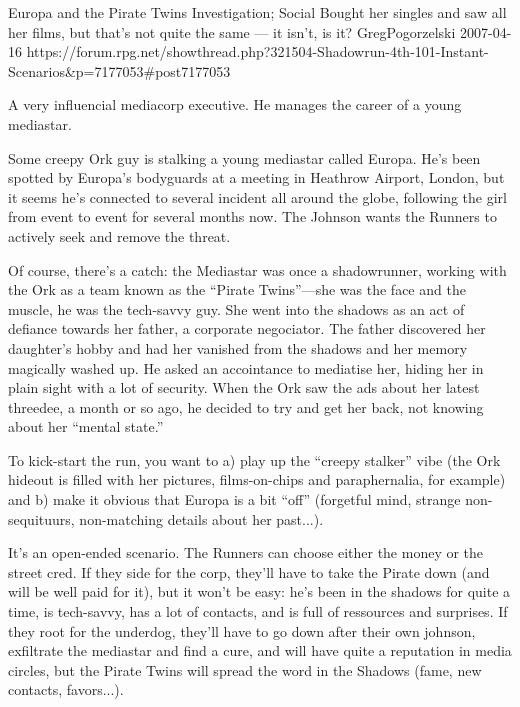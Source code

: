 \begin{scenario}{Europa and the Pirate Twins}
	{Investigation; Social}
	{Bought her singles and saw all her films, but that's not quite the same --- it isn't, is it?}
	{GregPogorzelski}
	{2007-04-16}
	{https://forum.rpg.net/showthread.php?321504-Shadowrun-4th-101-Instant-Scenarios\&p=7177053\#post7177053}

A very influencial mediacorp executive. He manages the career of a young mediastar.

\synopsis Some creepy Ork guy is stalking a young mediastar called Europa. He's been spotted by Europa's bodyguards at a meeting in Heathrow Airport, London, but it seems he's connected to several incident all around the globe, following the girl from event to event for several months now. The Johnson wants the Runners to actively seek and remove the threat.

\twist Of course, there's a catch: the Mediastar was once a shadowrunner, working with the Ork as a team known as the ``Pirate Twins''---she was the face and the muscle, he was the tech-savvy guy. She went into the shadows as an act of defiance towards her father, a corporate negociator. The father discovered her daughter's hobby and had her vanished from the shadows and her memory magically washed up. He asked an accointance to mediatise her, hiding her in plain sight with a lot of security. When the Ork saw the ads about her latest threedee, a month or so ago, he decided to try and get her back, not knowing about her ``mental state.''

\notes To kick-start the run, you want to a) play up the ``creepy stalker'' vibe (the Ork hideout is filled with her pictures, films-on-chips and paraphernalia, for example) and b) make it obvious that Europa is a bit ``off'' (forgetful mind, strange non-sequituurs, non-matching details about her past...).

It's an open-ended scenario. The Runners can choose either the money or the street cred. If they side for the corp, they'll have to take the Pirate down (and will be well paid for it), but it won't be easy: he's been in the shadows for quite a time, is tech-savvy, has a lot of contacts, and is full of ressources and surprises. If they root for the underdog, they'll have to go down after their own johnson, exfiltrate the mediastar and find a cure, and will have quite a reputation in media circles, but the Pirate Twins will spread the word in the Shadows (fame, new contacts, favors...). 

\end{scenario}